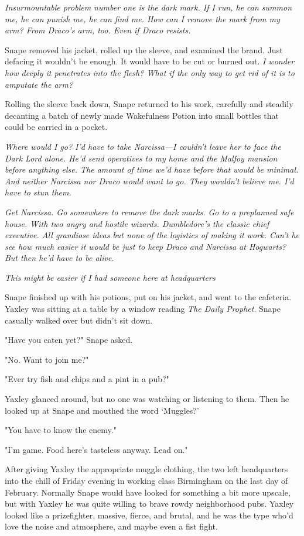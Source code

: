 \emph{Insurmountable problem number one is the dark mark. If I run, he can summon me, he can punish me, he can find me. How can I remove the mark from my arm? From Draco's arm, too. Even if Draco resists.}

Snape removed his jacket, rolled up the sleeve, and examined the brand. Just defacing it wouldn't be enough. It would have to be cut or burned out. \emph{I wonder how deeply it penetrates into the flesh? What if the only way to get rid of it is to amputate the arm?}

Rolling the sleeve back down, Snape returned to his work, carefully and steadily decanting a batch of newly made Wakefulness Potion into small bottles that could be carried in a pocket.

\emph{Where would I go? I'd have to take Narcissa—I couldn't leave her to face the Dark Lord alone. He'd send operatives to my home and the Malfoy mansion before anything else. The amount of time we'd have before that would be minimal. And neither Narcissa nor Draco would want to go. They wouldn't believe me. I'd have to stun them.}

\emph{Get Narcissa. Go somewhere to remove the dark marks. Go to a preplanned safe house. With two angry and hostile wizards. Dumbledore's the classic chief executive. All grandiose ideas but none of the logistics of making it work. Can't he see how much easier it would be just to keep Draco and Narcissa at Hogwarts? But then he'd have to be alive.}

\emph{This might be easier if I had someone here at headquarters{\el}}

Snape finished up with his potions, put on his jacket, and went to the cafeteria. Yaxley was sitting at a table by a window reading \emph{The Daily Prophet}. Snape casually walked over but didn't sit down.

"Have you eaten yet?" Snape asked.

"No. Want to join me?"

"Ever try fish and chips and a pint in a pub?"

Yaxley glanced around, but no one was watching or listening to them. Then he looked up at Snape and mouthed the word `Muggles?'

"You have to know the enemy."

"I'm game. Food here's tasteless anyway. Lead on."

After giving Yaxley the appropriate muggle clothing, the two left headquarters into the chill of Friday evening in working class Birmingham on the last day of February. Normally Snape would have looked for something a bit more upscale, but with Yaxley he was quite willing to brave rowdy neighborhood pubs. Yaxley looked like a prizefighter, massive, fierce, and brutal, and he was the type who'd love the noise and atmosphere, and maybe even a fist fight.

